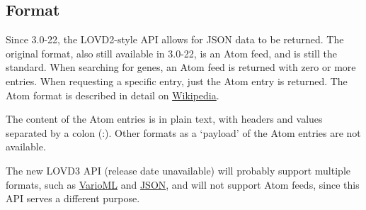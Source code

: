 \subsection{Format}
Since 3.0-22, the LOVD2-style API allows for JSON data to be returned.
The original format, also still available in 3.0-22, is an Atom feed, and is still the standard.
When searching for genes, an Atom feed is returned with zero or more entries.
When requesting a specific entry, just the Atom entry is returned.
The Atom format is described in detail on \href{http://en.wikipedia.org/wiki/Atom_(standard)}{Wikipedia}.

The content of the Atom entries is in plain text, with headers and values separated by a colon (:).
Other formats as a `payload' of the Atom entries are not available.

The new LOVD3 API (release date unavailable) will probably support multiple formats, such as
 \href{http://www.varioml.org/}{VarioML} and \href{http://www.json.org/}{JSON},
 and will not support Atom feeds, since this API serves a different purpose.

